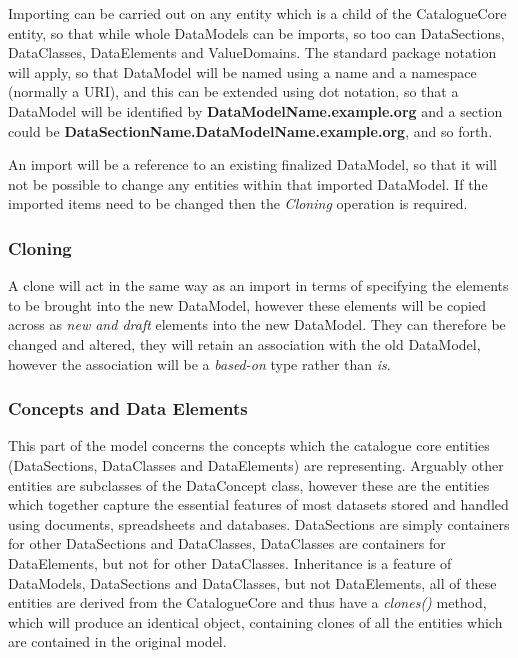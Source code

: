 \documentclass{article}
\begin{document}
Importing can be carried out on any entity which is a child of the CatalogueCore entity, so that while whole DataModels can be imports, so too can DataSections, DataClasses, DataElements and ValueDomains. The standard package notation will apply, so that DataModel will be named using a name and a namespace (normally a URI), and this can be extended using dot notation, so that a DataModel will be identified by \textbf{DataModelName.example.org} and a section could be \textbf{DataSectionName.DataModelName.example.org}, and so forth.

An import will be a reference to an existing finalized DataModel, so that it will not be possible to change any entities within that imported DataModel. If the imported items need to be changed then the \emph{Cloning} operation is required.

\subsubsection{Cloning}

A clone will act in the same way as an import in terms of specifying the elements to be brought into the new DataModel, however these elements will be copied across as \emph{new and draft} elements into the new DataModel. They can therefore be changed and altered, they will retain an association with the old DataModel, however the association will be a \emph{based-on} type rather than \emph{is}. 

\subsubsection{Concepts and Data Elements}

This part of the model concerns the concepts which the catalogue core entities (DataSections, DataClasses and DataElements) are representing. Arguably other entities are subclasses of the DataConcept class, however these are the entities which together capture the essential features of most datasets stored and handled using documents, spreadsheets and databases. DataSections are simply containers for other DataSections and DataClasses, DataClasses are containers for DataElements, but not for other DataClasses. Inheritance is a feature of DataModels, DataSections and DataClasses, but not DataElements, all of these entities are derived from the CatalogueCore and thus have a \emph{clones()} method, which will produce an identical object, containing clones of all the entities which are contained in the original model.
\end{document}
